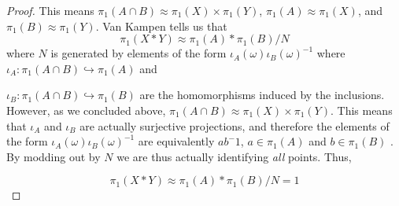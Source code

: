 \begin{homework}[e]
\begin{proof}
    This means $\pi_1(A \cap B) \approx \pi_1(X) \times \pi_1(Y)$, $\pi_1(A) \approx \pi_1(X)$, and $\pi_1(B) \approx \pi_1(Y)$. Van Kampen tells us that 
    \begin{equation*}
        \pi_1(X*Y) \approx \pi_1(A) * \pi_1(B) / N 
    \end{equation*}
    where $N$ is generated by elements of the form $\iota_A(\omega)\iota_B(\omega)^{-1}$ where $\iota_A: \pi_1(A \cap B) \hookrightarrow \pi_1(A)$ and 
    
    \noindent
    $\iota_B: \pi_1(A \cap B) \hookrightarrow \pi_1(B)$ are the homomorphisms induced by the inclusions. However, as we concluded above, $\pi_1(A \cap B) \approx \pi_1(X) \times \pi_1(Y)$. This means that $\iota_A$ and $\iota_B$ are actually surjective projections, and therefore the elements of the form $\iota_A(\omega)\iota_B(\omega)^{-1}$ are equivalently $ab^-1$, $a \in \pi_1(A)$ and $b \in \pi_1(B)$ . By modding out by $N$ we are thus actually identifying \emph{all} points. Thus, 
    
    \begin{equation*}
        \pi_1(X * Y) \approx \pi_1(A) * \pi_1(B) / N = 1
    \end{equation*}
\end{proof}

\newpage
\end{homework}
